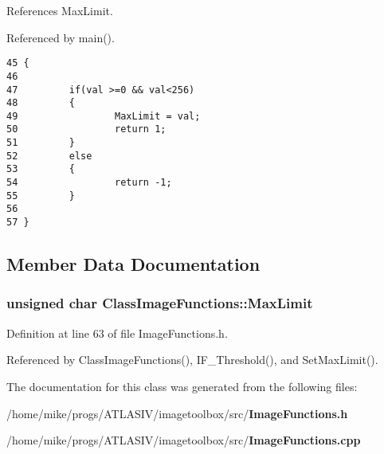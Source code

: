 References Max\-Limit.

Referenced by main().

\footnotesize\begin{verbatim}45 {
46 
47         if(val >=0 && val<256)
48         {       
49                 MaxLimit = val;
50                 return 1;
51         }
52         else
53         {       
54                 return -1;
55         }
56 
57 }
\end{verbatim}\normalsize 




\subsection{Member Data Documentation}
\subsubsection{\setlength{\rightskip}{0pt plus 5cm}unsigned char {\bf Class\-Image\-Functions::Max\-Limit}\hspace{0.3cm}{\tt  [private]}}\label{classClassImageFunctions_ClassImageFunctionsr0}


Definition at line 63 of file Image\-Functions.h.

Referenced by Class\-Image\-Functions(), IF\_\-Threshold(), and Set\-Max\-Limit().

The documentation for this class was generated from the following files:\begin{CompactItemize}
\item 
/home/mike/progs/ATLASIV/imagetoolbox/src/{\bf Image\-Functions.h}\item 
/home/mike/progs/ATLASIV/imagetoolbox/src/{\bf Image\-Functions.cpp}\end{CompactItemize}
